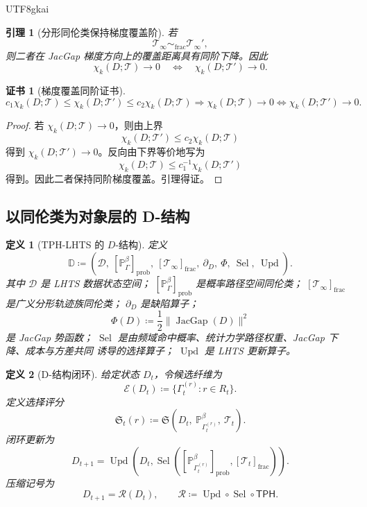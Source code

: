 \documentclass[12pt]{article}
\newtheorem{definition}{定义}[section]
\newtheorem{lemma}{引理}[section]
\newtheorem{Certificate}{证书}[section]
\newcommand{\TPH}{\ensuremath{\mathsf{TPH}}}
\newcommand{\DefEq}{\coloneqq}
\DeclareMathOperator{\JacGap}{JacGap}
\DeclareMathOperator{\Sel}{Sel}
\DeclareMathOperator{\Upd}{Upd}
\begin{document}
\begin{CJK*}{UTF8}{gkai}
\begin{lemma}[分形同伦类保持梯度覆盖阶]
若
\[
\mathcal T_\infty\sim_{\mathrm{frac}}\mathcal T_\infty',
\]
则二者在 JacGap 梯度方向上的覆盖距离具有同阶下降。因此
\[
\chi_k(D;\mathcal T)\to0
\quad\Longleftrightarrow\quad
\chi_k(D;\mathcal T')\to0.
\]
\end{lemma}

\begin{Certificate}[梯度覆盖同阶证书]
\[
\boxed{
c_1\chi_k(D;\mathcal T)
\le
\chi_k(D;\mathcal T')
\le
c_2\chi_k(D;\mathcal T)
\Rightarrow
\chi_k(D;\mathcal T)\to0
\Longleftrightarrow
\chi_k(D;\mathcal T')\to0.
}
\]
\end{Certificate}

\begin{proof}
若 \(\chi_k(D;\mathcal T)\to0\)，则由上界
\[
\chi_k(D;\mathcal T')\le c_2\chi_k(D;\mathcal T)
\]
得到 \(\chi_k(D;\mathcal T')\to0\)。反向由下界等价地写为
\[
\chi_k(D;\mathcal T)
\le
c_1^{-1}\chi_k(D;\mathcal T')
\]
得到。因此二者保持同阶梯度覆盖。引理得证。
\end{proof}

\subsection{以同伦类为对象层的 D-结构}
\label{subsec:d-structure-definition}

\begin{definition}[TPH-LHTS 的 \(D\)-结构]
定义
\[
\boxed{
\mathbb D
\DefEq
\left(
\mathcal D,\
[\mathbb P_\Gamma^\beta]_{\mathrm{prob}},\
[\mathcal T_\infty]_{\mathrm{frac}},\
\partial_D,\
\Phi,\
\Sel,\
\Upd
\right).
}
\]
其中 \(\mathcal D\) 是 LHTS 数据状态空间；
\([\mathbb P_\Gamma^\beta]_{\mathrm{prob}}\) 是概率路径空间同伦类；
\([\mathcal T_\infty]_{\mathrm{frac}}\) 是广义分形轨迹族同伦类；
\(\partial_D\) 是缺陷算子；
\[
\Phi(D)\DefEq\frac12\|\JacGap(D)\|^2
\]
是 JacGap 势函数；
\(\Sel\) 是由频域命中概率、统计力学路径权重、JacGap 下降、成本与方差共同
诱导的选择算子；
\(\Upd\) 是 LHTS 更新算子。
\end{definition}

\begin{definition}[D-结构闭环]
给定状态 \(D_t\)，令候选纤维为
\[
\mathcal E(D_t)
\DefEq
\{\Gamma_t^{(r)}:r\in R_t\}.
\]
定义选择评分
\[
\mathfrak S_t(r)
\DefEq
\mathfrak S
\left(
D_t,\
\mathbb P_{\Gamma_t^{(r)}}^\beta,\
\mathcal T_t
\right).
\]
闭环更新为
\[
\boxed{
D_{t+1}
=
\Upd
\left(
D_t,
\Sel
\left(
[\mathbb P_{\Gamma_t^{(r)}}^\beta]_{\mathrm{prob}},
[\mathcal T_t]_{\mathrm{frac}}
\right)
\right).
}
\]
压缩记号为
\[
\boxed{
D_{t+1}=\mathcal R(D_t),
\qquad
\mathcal R\DefEq \Upd\circ\Sel\circ\TPH.
}
\]
\end{definition}


\end{CJK*}
\end{document}
